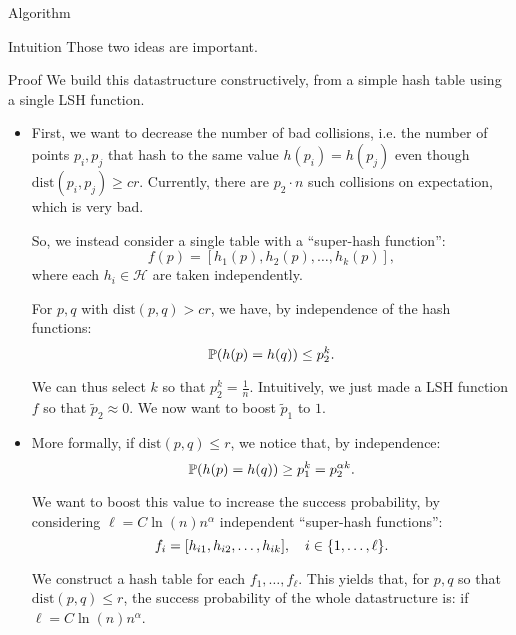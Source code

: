 \documentclass[a4paper]{article}
\begin{document}
\begin{parag}{Algorithm}
\begin{subparag}{Intuition}
        Those two ideas are important.
    \end{subparag}

    \begin{subparag}{Proof}
        We build this datastructure constructively, from a simple hash table using a single LSH function.

        \begin{itemize}[left=0pt]
            \item First, we want to decrease the number of bad collisions, i.e. the number of points $p_i, p_j$ that hash to the same value $h\left(p_i\right) = h\left(p_j\right)$ even though $\text{dist}\left(p_i, p_j\right) \geq cr$. Currently, there are $p_2\cdot n$ such collisions on expectation, which is very bad. 

            So, we instead consider a single table with a ``super-hash function'': 
            \[f\left(p\right) = \left[h_1\left(p\right), h_2\left(p\right), \ldots, h_k\left(p\right)\right],\]
            where each $h_i \in \mathcal{H}$ are taken independently.

            For $p, q$ with $\text{dist}\left(p, q\right) > cr$, we have, by independence of the hash functions: 
            \[\prob\left(h\left(p\right) = h\left(q\right)\right) \leq p_2^k.\]
           
            We can thus select $k$ so that $p_2^k = \frac{1}{n}$. Intuitively, we just made a LSH function $f$ so that $\widetilde{p}_2 \approx 0$. We now want to boost $\widetilde{p}_1$ to $1$.
            
            \item More formally, if $\text{dist}\left(p, q\right) \leq r$, we notice that, by independence:
            \[\prob\left(h\left(p\right) = h\left(q\right)\right) \geq p_1^k = p_2^{\alpha k}.\]

            We want to boost this value to increase the success probability, by considering $\ell = C \ln\left(n\right)n^{\alpha} $ independent ``super-hash functions'': 
            \[f_i = \left[h_{i1}, h_{i2}, \ldots, h_{ik}\right], \mathspace i \in \left\{1, \ldots, \ell\right\}.\]

            We construct a hash table for each $f_1, \ldots, f_{\ell}$. This yields that, for $p, q$ so that $\text{dist}\left(p, q\right) \leq r$, the success probability of the whole datastructure is: 
            if $\ell = C \ln\left(n\right) n^{\alpha}$.
        \end{itemize}


\end{subparag}
\end{parag}
\end{document}
